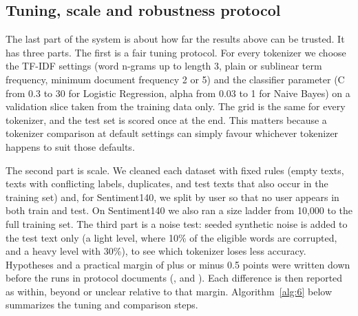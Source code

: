 \documentclass[journal,a4paper]{IEEEtran}
\begin{document}
\subsection{Tuning, scale and robustness protocol}\label{sec:3.7}
The last part of the system is about how far the results above can be trusted. It has three parts. The first is a fair tuning protocol. For every tokenizer we choose the TF-IDF settings (word n-grams up to length 3, plain or sublinear term frequency, minimum document frequency 2 or 5) and the classifier parameter (C from 0.3 to 30 for Logistic Regression, alpha from 0.03 to 1 for Naive Bayes) on a validation slice taken from the training data only. The grid is the same for every tokenizer, and the test set is scored once at the end. This matters because a tokenizer comparison at default settings can simply favour whichever tokenizer happens to suit those defaults.

The second part is scale. We cleaned each dataset with fixed rules (empty texts, texts with conflicting labels, duplicates, and test texts that also occur in the training set) and, for Sentiment140, we split by user so that no user appears in both train and test. On Sentiment140 we also ran a size ladder from 10,000 to the full training set. The third part is a noise test: seeded synthetic noise is added to the test text only (a light level, where 10\% of the eligible words are corrupted, and a heavy level with 30\%), to see which tokenizer loses less accuracy. Hypotheses and a practical margin of plus or minus 0.5 points were written down before the runs in protocol documents (,  and ). Each difference is then reported as within, beyond or unclear relative to that margin. Algorithm~\ref{alg:6} below summarizes the tuning and comparison steps.
\end{document}
